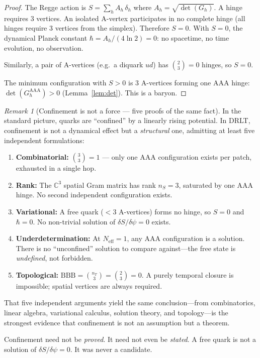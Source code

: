 \documentclass[12pt]{article}
\theoremstyle{remark}
\newtheorem{remark}[theorem]{Remark}
\theoremstyle{definition}
\newcommand{\CC}{\mathbb{C}}
\begin{document}
\begin{proof}
The Regge action is $S = \sum_h A_h\,\delta_h$ where $A_h = \sqrt{\det(G_h)}$.  A hinge requires 3 vertices.  An isolated A-vertex participates in no complete hinge (all hinges require 3 vertices from the simplex).  Therefore $S = 0$.  With $S = 0$, the dynamical Planck constant $\hbar = A_h/(4\ln 2) = 0$: no spacetime, no time evolution, no observation.

Similarly, a pair of A-vertices (e.g.\ a diquark $ud$) has $\binom{2}{3} = 0$ hinges, so $S = 0$.

The minimum configuration with $S > 0$ is 3 A-vertices forming one AAA hinge: $\det(G_h^{\mathrm{AAA}}) > 0$ (Lemma~\ref{lem:det}).  This is a baryon.
\end{proof}

\begin{remark}[Confinement is not a force --- five proofs of the same fact]
In the standard picture, quarks are ``confined'' by a linearly rising potential.  In DRLT, confinement is not a dynamical effect but a \emph{structural} one, admitting at least five independent formulations:
\begin{enumerate}
\item \textbf{Combinatorial:} $\binom{3}{3} = 1$ --- only one AAA configuration exists per patch, exhausted in a single hop.
\item \textbf{Rank:} The $\CC^3$ spatial Gram matrix has rank $n_S = 3$, saturated by one AAA hinge.  No second independent configuration exists.
\item \textbf{Variational:} A free quark ($< 3$ A-vertices) forms no hinge, so $S = 0$ and $\hbar = 0$.  No non-trivial solution of $\delta S/\delta\psi = 0$ exists.
\item \textbf{Underdetermination:} At $N_\text{eff} = 1$, any AAA configuration is a solution.  There is no ``unconfined'' solution to compare against---the free state is \emph{undefined}, not forbidden.
\item \textbf{Topological:} $\text{BBB} = \binom{n_T}{3} = \binom{2}{3} = 0$.  A purely temporal closure is impossible; spatial vertices are always required.
\end{enumerate}
That five independent arguments yield the same conclusion---from combinatorics, linear algebra, variational calculus, solution theory, and topology---is the strongest evidence that confinement is not an assumption but a theorem.

Confinement need not be \emph{proved}.  It need not even be \emph{stated}.  A free quark is not a solution of $\delta S/\delta\psi = 0$.  It was never a candidate.
\end{remark}
\end{document}
